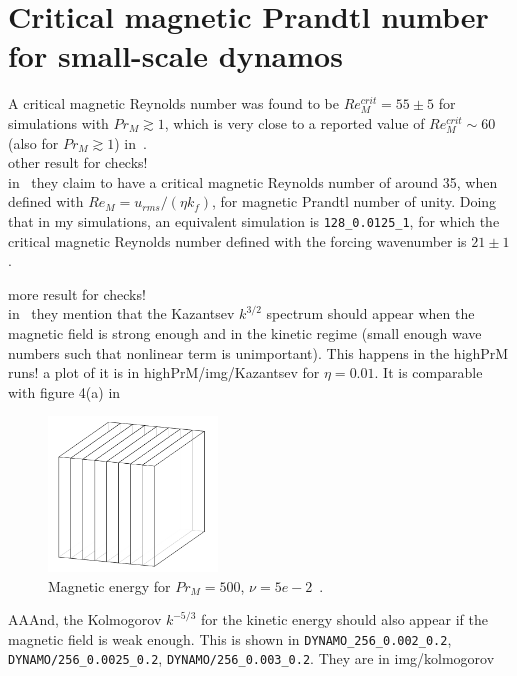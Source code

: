 \documentclass[12pt,a4paper]{report}
\begin{document}
\section{Critical magnetic Prandtl number for small-scale dynamos}

A critical magnetic Reynolds number was found to be $Re_M^{crit}=55\pm5$ for simulations with $Pr_M\gtrsim1$, which is very close to a reported value of $Re_M^{crit}\sim60$ (also for $Pr_M\gtrsim1$) in~\cite{schekochihin2007fluctuation}.\\

other result for checks!\\

in~\cite{haugen2004simulations} they claim to have a critical magnetic Reynolds number of around 35, when defined with $Re_M=u_{rms}/(\eta k_f)$, for magnetic Prandtl number of unity. Doing that in my simulations, an equivalent simulation is \texttt{128\_0.0125\_1}, for which the critical magnetic Reynolds number defined with the forcing wavenumber is $21 \pm 1$.

more result for checks!\\

in~\cite{haugen2004simulations} they mention that the Kazantsev $k^{3/2}$ spectrum should appear when the magnetic field is strong enough and in the kinetic regime (small enough wave numbers such that nonlinear term is unimportant). This happens in the highPrM runs! a plot of it is in {highPrM/img/Kazantsev} for $\eta=0.01$. It is comparable with figure 4(a) in~\cite{schekochihin2004simulations} 

\begin{figure}[!ht]
\centering
\includegraphics[width=0.4\textwidth]{img/slices}
\caption{Magnetic energy for $Pr_M=500$, $\nu=5e-2$~\cite{schekochihin2004simulations}.}
\label{figure}
\end{figure}



AAAnd, the Kolmogorov $k^{-5/3}$ for the kinetic energy should also appear if the magnetic field is weak enough. This is shown in \texttt{DYNAMO\_256\_0.002\_0.2}, \texttt{DYNAMO/256\_0.0025\_0.2}, \texttt{DYNAMO/256\_0.003\_0.2}. They are in {img/kolmogorov}
\end{document}
